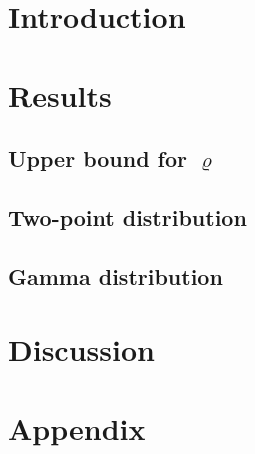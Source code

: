 \documentclass[paper=a4]{scrartcl}
\begin{document}


\section{Introduction}

  

\section{Results}

  

  \subsection*{Upper bound for $\varrho$}

    

  \subsection*{Two-point distribution}  

    

  \subsection*{Gamma distribution}

    

    \clearpage
    
\section{Discussion}

  
    
    \newpage
\clearpage     
\section{Appendix}

  


\clearpage

\printbibliography
  
  
\end{document}
